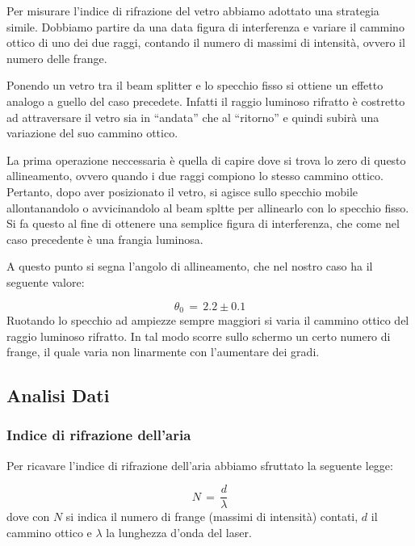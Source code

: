 Per misurare l'indice di rifrazione del vetro abbiamo adottato una strategia simile. Dobbiamo partire da una data figura di interferenza e variare il cammino ottico di uno dei due raggi, contando il numero di massimi di intensità, ovvero il numero delle frange.

Ponendo un vetro tra il beam splitter e lo specchio fisso si ottiene un effetto analogo a guello del caso precedete. Infatti il raggio luminoso rifratto è costretto ad attraversare il vetro sia in ``andata'' che al ``ritorno'' e quindi subirà una variazione del suo cammino ottico.

La prima operazione neccessaria è quella di capire dove si trova lo zero di questo allineamento, ovvero quando i due raggi compiono lo stesso cammino ottico. Pertanto, dopo aver posizionato il vetro, si agisce sullo specchio mobile allontanandolo o avvicinandolo al beam spltte per allinearlo con lo specchio fisso. Si fa questo al fine di ottenere una semplice figura di interferenza, che come nel caso precedente è una frangia luminosa.

A questo punto si segna l'angolo di allineamento, che nel nostro caso ha il seguente valore:

\begin{equation}
	\theta_0 \,=\, 2.2 \pm 0.1
\end{equation}
%
Ruotando lo specchio ad ampiezze sempre maggiori si varia il cammino ottico del raggio luminoso rifratto. In tal modo scorre sullo schermo un certo numero di frange, il quale varia non linarmente con l'aumentare dei gradi.

\subsection{Analisi Dati}

\subsubsection{Indice di rifrazione dell'aria} %

Per ricavare l'indice di rifrazione dell'aria abbiamo sfruttato la seguente legge:

\begin{equation}
	N \,=\, \frac{d}{\lambda}
\end{equation}
%
dove con $N$  si indica il numero di frange (massimi di intensità) contati, $d$ il cammino ottico e $\lambda$ la lunghezza d'onda del laser.

